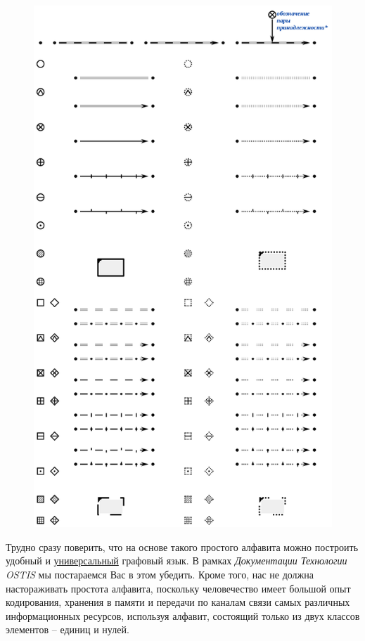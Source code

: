 

\begin{figure}[h]
	\centering
	\includegraphics[scale=0.8]{images/intro/scg/SCg-full.png}
\end{figure}


\bigskip
Трудно сразу поверить, что на основе такого простого алфавита можно построить удобный и \uline{универсальный} графовый язык. В рамках \textit{Документации Технологии OSTIS} мы постараемся Вас в этом убедить. Кроме того, нас не должна настораживать простота алфавита, поскольку человечество имеет большой опыт кодирования, хранения в памяти и передачи по каналам связи самых различных информационных ресурсов, используя алфавит, состоящий только из двух классов элементов -- единиц и нулей. 

